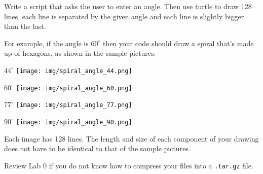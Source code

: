 \documentclass[11pt]{cselabheader}
\begin{document}
\begin{ex}[spiral.py]
Write a script that asks the user to enter an angle.
Then use turtle to draw 128 lines, each line is separated by the given angle
and each line is slightly bigger than the last.

For example, if the angle is $60^\circ$ then your code should draw a spiral
that's made up of hexagons, as shown in the sample pictures.

\begin{multicols}{2}
\begin{center}
$44^\circ$
\texttt{[image: img/spiral\_angle\_44.png]}

$60^\circ$
\texttt{[image: img/spiral\_angle\_60.png]}

$77^\circ$
\texttt{[image: img/spiral\_angle\_77.png]}

$90^\circ$
\texttt{[image: img/spiral\_angle\_90.png]}
\end{center}
\end{multicols}

Each image has 128 lines. The length and size of each component of your drawing
does not have to be identical to that of the sample pictures.
\end{ex}

\newpage
\printindex
\vfill
Review Lab 0 if you do not know how to compress your files into
a \texttt{.tar.gz} file.

\end{document}
